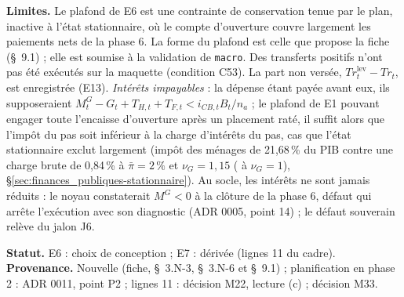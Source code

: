 \documentclass[11pt,a4paper]{article}
\newcommand{\limites}{\par\noindent\textbf{Limites.} }
\newcommand{\barre}[1]{\leavevmode\sbox{\boitebarre}{#1}\rlap{\rule[0.6ex]{\wd\boitebarre}{0.4pt}}\usebox{\boitebarre}}
\begin{document}
\begin{proposee}
\limites Le plafond de E6 est une contrainte de conservation tenue par le plan, inactive à l'état stationnaire, où le compte d'ouverture couvre largement les paiements nets de la phase 6. La forme du plafond est celle que propose la fiche (\S~9.1) ; elle est soumise à la validation de \texttt{macro}. Des transferts positifs n'ont pas été exécutés sur la maquette (condition C53). La part non versée, $\mathit{Tr}^{\mathrm{lev}}_t - \mathit{Tr}_t$, est enregistrée (E13). \emph{Intérêts impayables} : la dépense étant payée avant eux, ils supposeraient $M^G_t - G_t + T_{H,t} + T_{F,t} < i_{\mathit{CB},t}B_t/n_a$ ; le plafond de E1 pouvant engager toute l'encaisse d'ouverture après un placement raté, il suffit alors que l'impôt du pas soit inférieur à la charge d'intérêts du pas, cas que l'état stationnaire exclut largement (impôt des ménages de 21,68\,\% du PIB contre une charge brute de 0,84\,\% à $\bar\pi = 2\,\%$ et $\nu_G = 1{,}15$ (\barre{0,83\,\%} à $\nu_G = 1$), \S\ref{sec:finances_publiques-stationnaire}). Au socle, les intérêts ne sont jamais réduits : le noyau constaterait $M^G < 0$ à la clôture de la phase 6, défaut qui arrête l'exécution avec son diagnostic (ADR 0005, point 14) ; le défaut souverain relève du jalon J6.

\textbf{Statut.} E6 : choix de conception ; E7 : dérivée (lignes 11 du cadre). \textbf{Provenance.} Nouvelle (fiche, \S~3.N-3, \S~3.N-6 et \S~9.1) ; planification en phase 2 : ADR 0011, point P2 ; lignes 11 : décision M22, lecture (c) ; décision M33.
\end{proposee}
\end{document}
